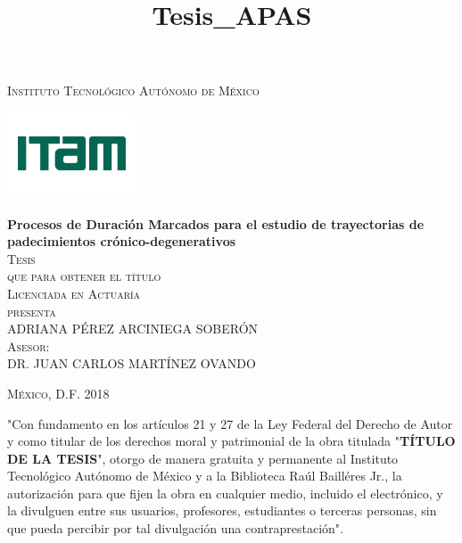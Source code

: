 \documentclass[letterpaper,oneside,11pt,review]{book}
\theoremstyle{plain}
\begin{document}
\pagestyle{empty} %

\title{Tesis_APAS} %

\begin{titlepage}
\begin{center}

\textsc{\Large Instituto Tecnol\'ogico Aut\'onomo de M\'exico}\\[4em]

\begin{center}
	\includegraphics{DocumentosLaTex/ITAM_2016}
\end{center}

\vspace{2em}

{\sc \huge {\bf Procesos de Duraci\'on Marcados para el estudio de trayectorias de padecimientos cr\'onico-degenerativos}}\\[2em]

\textsc{\large Tesis}\\[1em]

\textsc{que para obtener el t\'itulo}\\[1em]

\textsc{Licenciada en Actuar\'ia}\\[1em]

\textsc{presenta}\\[1em]

\textsc{\Large ADRIANA P\'EREZ ARCINIEGA SOBER\'ON }\\[1em]

\textsc{\large Asesor:}\\
\textsc{DR. JUAN CARLOS MART\'INEZ OVANDO}\\[1em]

\end{center}

\vspace*{\fill}
\textsc{M\'exico, D.F. \hspace*{\fill} 2018}

\end{titlepage}

\thispagestyle{empty}
\vspace*{\fill}
\begingroup
"Con fundamento en los art\'iculos 21 y 27 de la Ley Federal del Derecho de Autor y como titular de los derechos moral y patrimonial de la obra titulada "\textbf{T\'ITULO DE LA TESIS}", otorgo de manera gratuita y permanente al Instituto Tecnol\'ogico Aut\'onomo de M\'exico y a la Biblioteca Ra\'ul Baill\'eres Jr., la autorizaci\'on para que fijen la obra en cualquier medio, incluido el electr\'onico, y la divulguen entre sus usuarios, profesores, estudiantes o terceras personas, sin que pueda percibir por tal divulgaci\'on una contraprestaci\'on".
\end{document}
